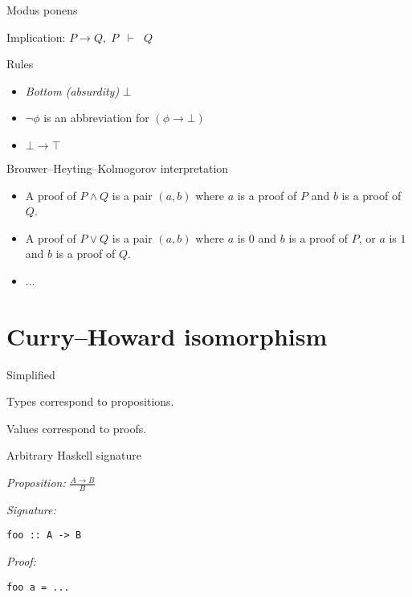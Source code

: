 \documentclass[17pt]{beamer}
\begin{document}
\begin{frame}{Modus ponens}
\begin{center}
Implication: $P \to Q,\; P\;\; \vdash\;\; Q$
\end{center}
\end{frame}

\begin{frame}{Rules}
\begin{itemize}
	\item \emph{Bottom (absurdity)} $\bot$
	\item $\neg \phi$ is an abbreviation for $(\phi \to \bot)$
	\item $\bot \to \top$
\end{itemize}
\end{frame}

\begin{frame}{Brouwer–Heyting–Kolmogorov interpretation}
\begin{itemize}
	\item A proof of $P\wedge Q$ is a pair $(a,b)$ where $a$ is a proof of $P$ and $b$ is a proof of $Q$.
	\item A proof of $P\vee Q$ is a pair $(a,b)$ where $a$ is $0$ and $b$ is a proof of $P$, or $a$ is $1$ and $b$ is a proof of $Q$.
	\item ...
\end{itemize}
\end{frame}

\section{Curry–Howard isomorphism}

\begin{frame}{Simplified}

Types correspond to propositions.

Values correspond to proofs.

\end{frame}

\begin{frame}[fragile]{Arbitrary Haskell signature}

\emph{Proposition:} $\frac{A \to B}{B}$

\emph{Signature:} 
\begin{lstlisting}
foo :: A -> B
\end{lstlisting}

\emph{Proof:}
\begin{lstlisting}
foo a = ...
\end{lstlisting}


\end{frame}
\end{document}
